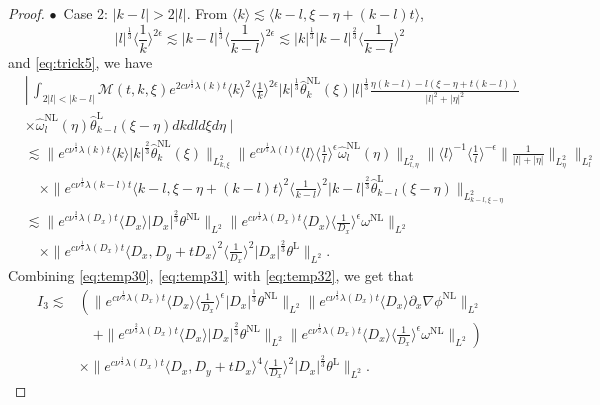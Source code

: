 \documentclass[reqno, 12pt]{amsart} %
\theoremstyle{plain} %
\theoremstyle{definition}
\theoremstyle{remark}
\numberwithin{equation}{section} %
\newcommand{\no}{\nonumber}
\newcommand{\lt}{\left}
\newcommand{\rt}{\right}
\begin{document}
\begin{proof}
		
		$\bullet$~Case 2: $|k-l| > 2|l|$. From $\langle k\rangle \lesssim \langle k-l, \xi-\eta+(k-l) t\rangle$, 
		$$
		|l|^\frac13 \langle\frac{1}{k}\rangle^{2 \epsilon}\lesssim |k-l|^\frac13 \langle\frac{1}{k - l}\rangle^{2\epsilon} \lesssim |k|^\frac13 |k-l|^\frac23 \langle\frac{1}{k - l}\rangle^{2} 
		$$ 
		and \eqref{eq:trick5}, we have
		\begin{align} \label{eq:temp32}
			& \left\lvert\, \int_{2|l|<|k-l|} \mathcal{M}(t, k, \xi) e^{2 c \nu^{\frac{1}{3}} \lambda(k) t}\langle k\rangle^2\langle\frac{1}{k}\rangle^{2 \epsilon} |k|^\frac13\hat{\theta}_k^{\mathrm{NL}}(\xi) |l|^\frac13  \frac{\eta(k-l)-l(\xi-\eta+t(k-l))}{|l|^2+|\eta|^2}\right.\no \\
			& \times \hat{\omega}_l^{\mathrm{NL}}(\eta) \hat{\theta}_{k-l}^{\mathrm{L}}(\xi-\eta) d k d l d \xi d \eta \mid \no\\
			& \lesssim\|e^{c \nu^{\frac{1}{3}} \lambda(k) t}\langle k\rangle|k|^{\frac{2}{3}} \hat{\theta}_k^{\mathrm{NL}}(\xi)\|_{L_{k, \xi}^2}\|e^{c \nu^{\frac{1}{3}} \lambda(l) t}\langle l\rangle\langle\frac{1}{l}\rangle^\epsilon \hat{\omega}_l^{\mathrm{NL}}(\eta)\|_{L_{l, \eta}^2}\|\langle l\rangle^{-1}\langle\frac{1}{l}\rangle^{-\epsilon}\| \frac{1}{|l|+|\eta|}\|_{L_\eta^2}\|_{L_l^2} \no\\
			& \quad \times\|e^{c \nu^{\frac{1}{3}} \lambda(k-l) t}\langle k-l, \xi-\eta+(k-l) t\rangle^2\langle\frac{1}{k-l}\rangle^2|k-l|^{\frac{2}{3}} \hat{\theta}_{k-l}^{\mathrm{L}}(\xi-\eta)\|_{L_{k-l, \xi-\eta}^2} \no\\
			& \lesssim\|e^{c \nu^{\frac{2}{3}} \lambda\left(D_x\right) t}\langle D_x\rangle\left|D_x\right|^{\frac{2}{3}} \theta^{\mathrm{NL}}\|_{L^2}\|e^{c \nu^{\frac{1}{3}} \lambda\left(D_x\right) t}\langle D_x\rangle\langle\frac{1}{D_x}\rangle^\epsilon \omega^{\mathrm{NL}}\|_{L^2} \no\\
			& \quad \times\|e^{c \nu^{\frac{1}{3}} \lambda\left(D_x\right) t}\langle D_x, D_y+t D_x\rangle^2\langle\frac{1}{D_x}\rangle^2\left|D_x\right|^{\frac{2}{3}} \theta^{\mathrm{L}}\|_{L^2}.
		\end{align}
		Combining \eqref{eq:temp30}, \eqref{eq:temp31} with \eqref{eq:temp32}, we get that
		\begin{equation}\begin{aligned} \label{eq:est of I3}
				I_3 \lesssim& \lt( \|e^{c \nu^{\frac{1}{3}} \lambda\left(D_x\right) t}\langle D_x\rangle\langle\frac{1}{D_x}\rangle^\epsilon |D_x|^\frac13 \theta^{\mathrm{NL}}\|_{L^2}\|e^{c \nu^{\frac{1}{3}} \lambda\left(D_x\right) t}\langle D_x\rangle \partial_x \nabla \phi^{\mathrm{NL}}\|_{L^2} \rt. \\
				& \lt. \quad +\|e^{c \nu^{\frac{2}{3}} \lambda\left(D_x\right) t}\langle D_x\rangle\left|D_x\right|^{\frac{2}{3}} \theta^{\mathrm{NL}}\|_{L^2}\|e^{c \nu^{\frac{1}{3}} \lambda\left(D_x\right) t}\langle D_x\rangle\langle\frac{1}{D_x}\rangle^\epsilon \omega^{\mathrm{NL}}\|_{L^2} \rt)\\
				& \times\|e^{c \nu^{\frac{1}{3}} \lambda\left(D_x\right) t}\langle D_x, D_y+t D_x\rangle^4\langle\frac{1}{D_x}\rangle^2\left|D_x\right|^{\frac{2}{3}} \theta^{\mathrm{L}}\|_{L^2}.
		\end{aligned}\end{equation}
	

\end{proof}
\end{document}
